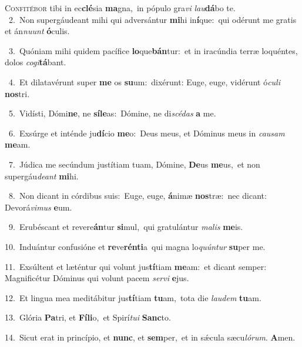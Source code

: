 \lettrine{\initial\textcolor{\initialcolor}{C}}{onfitébor} tibi in ec\-\textbf{clé}\-sia \textbf{ma}\-gna,~\star in pópulo gra\textit{vi} \textit{lau}\-\textbf{dá}bo te.\\
{\numbfont\textcolor{\numbcolor}{~2.}}~Non supergáudeant mihi qui adversántur \textbf{mi}\-hi in\-\textbf{í}\-que:~\star qui odérunt me gratis et án\-\textit{nu}\-\textit{unt} \textbf{ó}\-culis.\par
{\numbfont\textcolor{\numbcolor}{~3.}}~Quóniam mihi quidem pacífice \textbf{lo}\-que\-\textbf{bán}\-tur:~\star et in iracúndia terræ loquéntes, dolos \textit{co}\-\textit{gi}\textbf{tá}bant.\par
{\numbfont\textcolor{\numbcolor}{~4.}}~Et dilatavérunt super \textbf{me} os \textbf{su}\-um:~\star dixérunt: Euge, euge, vidérunt ó\-\textit{cu}\-\textit{li} \textbf{nos}\-tri.\par
{\numbfont\textcolor{\numbcolor}{~5.}}~Vidísti, Dómi\-\textbf{ne}\-, ne \textbf{sí}\-\textbf{le}as:~\star Dómine, ne di\-\textit{scé}\-\textit{das} \textbf{a} me.\par
{\numbfont\textcolor{\numbcolor}{~6.}}~Exsúrge et inténde ju\-\textbf{dí}\-cio \textbf{me}\-o:~\star Deus meus, et Dóminus meus in \textit{cau}\-\textit{sam} \textbf{me}\-am.\par
{\numbfont\textcolor{\numbcolor}{~7.}}~Júdica me secúndum justítiam tuam, Dómine, \textbf{De}\-us \textbf{me}\-us,~\star et non supergáu\-\textit{de}\-\textit{ant} \textbf{mi}\-hi.\par
{\numbfont\textcolor{\numbcolor}{~8.}}~Non dicant in córdibus suis:~\dagger Euge, euge, \textbf{á}\-nimæ \textbf{nos}\-træ:~\star nec dicant: Devorá\-\textit{vi}\-\textit{mus} \textbf{e}\-um.\par
{\numbfont\textcolor{\numbcolor}{~9.}}~Erubéscant et revere\-\textbf{án}\-tur \textbf{si}\-mul,~\star qui gratulántur \textit{ma}\-\textit{lis} \textbf{me}\-is.\par
{\numbfont\textcolor{\numbcolor}{10.}}~Induántur confusióne et \textbf{re}\-ve\-\textbf{rén}\-\textbf{ti}a~\star qui magna lo\-\textit{quún}\-\textit{tur} \textbf{su}\-per me.\par
{\numbfont\textcolor{\numbcolor}{11.}}~Exsúltent et læténtur qui volunt jus\-\textbf{tí}\-tiam \textbf{me}\-am:~\star et dicant semper: Magnificétur Dóminus qui volunt pacem \textit{ser}\-\textit{vi} \textbf{e}\-jus.\par
{\numbfont\textcolor{\numbcolor}{12.}}~Et lingua mea meditábitur jus\-\textbf{tí}\-tiam \textbf{tu}\-am,~\star tota die \textit{lau}\-\textit{dem} \textbf{tu}\-am.\par
{\numbfont\textcolor{\numbcolor}{13.}}~Glória \textbf{Pa}\-tri, et \textbf{Fí}\-\textbf{li}o,~\star et Spirí\-\textit{tu}\-\textit{i} \textbf{Sanc}\-to.\par
{\numbfont\textcolor{\numbcolor}{14.}}~Sicut erat in princípio, et \textbf{nunc}\-, et \textbf{sem}\-per,~\star et in sǽcula sæcu\-\textit{ló}\-\textit{rum}. \textbf{A}\-men.\par
